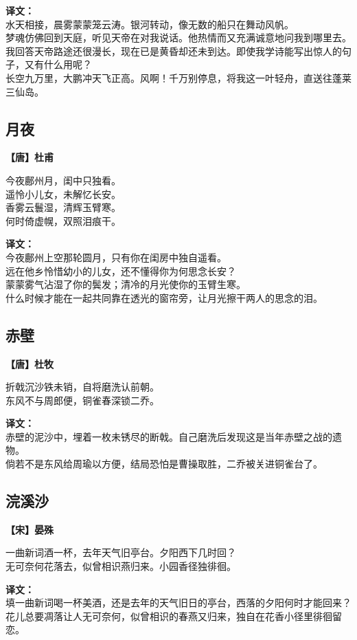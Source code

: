 \bigskip
\noindent\textbf{译文：}\\
水天相接，晨雾蒙蒙笼云涛。银河转动，像无数的船只在舞动风帆。\\
梦魂仿佛回到天庭，听见天帝在对我说话。他热情而又充满诚意地问我到哪里去。\\
我回答天帝路途还很漫长，现在已是黄昏却还未到达。即使我学诗能写出惊人的句子，又有什么用呢？\\
长空九万里，大鹏冲天飞正高。风啊！千万别停息，将我这一叶轻舟，直送往蓬莱三仙岛。


\subsection*{月夜}
\textbf{【唐】杜甫}

今夜鄜州月，闺中只独看。\\
遥怜小儿女，未解忆长安。\\
香雾云鬟湿，清辉玉臂寒。\\
何时倚虚幌，双照泪痕干。

\bigskip
\noindent\textbf{译文：}\\
今夜鄜州上空那轮圆月，只有你在闺房中独自遥看。\\
远在他乡怜惜幼小的儿女，还不懂得你为何思念长安？\\
蒙蒙雾气沾湿了你的鬓发；清冷的月光使你的玉臂生寒。\\
什么时候才能在一起共同靠在透光的窗帘旁，让月光擦干两人的思念的泪。


\subsection*{赤壁}
\textbf{【唐】杜牧}

折戟沉沙铁未销，自将磨洗认前朝。\\
东风不与周郎便，铜雀春深锁二乔。

\bigskip
\noindent\textbf{译文：}\\
赤壁的泥沙中，埋着一枚未锈尽的断戟。自己磨洗后发现这是当年赤壁之战的遗物。\\
倘若不是东风给周瑜以方便，结局恐怕是曹操取胜，二乔被关进铜雀台了。


\subsection*{浣溪沙}
\textbf{【宋】晏殊}

一曲新词酒一杯，去年天气旧亭台。夕阳西下几时回？\\
无可奈何花落去，似曾相识燕归来。小园香径独徘徊。

\bigskip
\noindent\textbf{译文：}\\
填一曲新词喝一杯美酒，还是去年的天气旧日的亭台，西落的夕阳何时才能回来？\\
花儿总要凋落让人无可奈何，似曾相识的春燕又归来，独自在花香小径里徘徊留恋。

